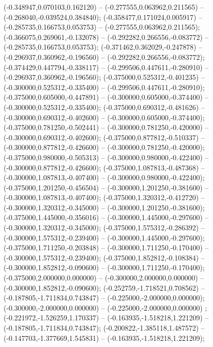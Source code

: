  (-0.348947,0.070103,0.162120) -- (-0.277555,0.063962,0.211565) -- (-0.268040,-0.039524,0.384840);
 (-0.358477,0.171024,0.005917) -- (-0.285735,0.166753,0.053753) -- (-0.277555,0.063962,0.211565);
 (-0.366075,0.269061,-0.132078) -- (-0.292282,0.266556,-0.083772) -- (-0.285735,0.166753,0.053753);
 (-0.371462,0.362029,-0.247878) -- (-0.296937,0.360962,-0.196560) -- (-0.292282,0.266556,-0.083772);
 (-0.374429,0.447794,-0.338117) -- (-0.299506,0.447611,-0.280910) -- (-0.296937,0.360962,-0.196560);
 (-0.375000,0.525312,-0.401235) -- (-0.300000,0.525312,-0.335400) -- (-0.299506,0.447611,-0.280910);
 (-0.375000,0.605000,-0.447891) -- (-0.300000,0.605000,-0.374400) -- (-0.300000,0.525312,-0.335400);
 (-0.375000,0.690312,-0.481626) -- (-0.300000,0.690312,-0.402600) -- (-0.300000,0.605000,-0.374400);
 (-0.375000,0.781250,-0.502441) -- (-0.300000,0.781250,-0.420000) -- (-0.300000,0.690312,-0.402600);
 (-0.375000,0.877812,-0.510337) -- (-0.300000,0.877812,-0.426600) -- (-0.300000,0.781250,-0.420000);
 (-0.375000,0.980000,-0.505313) -- (-0.300000,0.980000,-0.422400) -- (-0.300000,0.877812,-0.426600);
 (-0.375000,1.087813,-0.487368) -- (-0.300000,1.087813,-0.407400) -- (-0.300000,0.980000,-0.422400);
 (-0.375000,1.201250,-0.456504) -- (-0.300000,1.201250,-0.381600) -- (-0.300000,1.087813,-0.407400);
 (-0.375000,1.320312,-0.412720) -- (-0.300000,1.320312,-0.345000) -- (-0.300000,1.201250,-0.381600);
 (-0.375000,1.445000,-0.356016) -- (-0.300000,1.445000,-0.297600) -- (-0.300000,1.320312,-0.345000);
 (-0.375000,1.575312,-0.286392) -- (-0.300000,1.575312,-0.239400) -- (-0.300000,1.445000,-0.297600);
 (-0.375000,1.711250,-0.203848) -- (-0.300000,1.711250,-0.170400) -- (-0.300000,1.575312,-0.239400);
 (-0.375000,1.852812,-0.108384) -- (-0.300000,1.852812,-0.090600) -- (-0.300000,1.711250,-0.170400);
 (-0.375000,2.000000,0.000000) -- (-0.300000,2.000000,0.000000) -- (-0.300000,1.852812,-0.090600);
 (-0.252759,-1.718521,0.708562) -- (-0.187805,-1.711834,0.743847) -- (-0.225000,-2.000000,0.000000);
 (-0.300000,-2.000000,0.000000) -- (-0.225000,-2.000000,0.000000) ;
 (-0.221972,-1.526259,1.170337) -- (-0.163935,-1.518218,1.221209) -- (-0.187805,-1.711834,0.743847);
 (-0.200822,-1.385118,1.487572) -- (-0.147703,-1.377669,1.545831) -- (-0.163935,-1.518218,1.221209);
